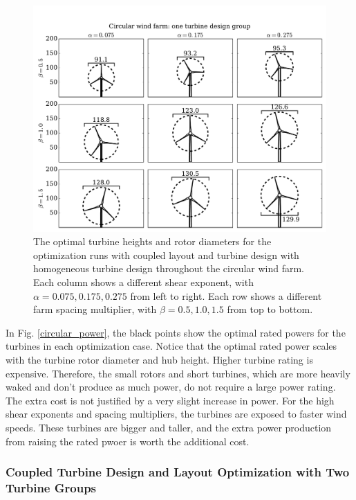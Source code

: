 \begin{figure}[htbp]
  \centering
  \includegraphics[trim={0.5cm 0.3cm 0.3cm 1.75cm},clip,width=\textwidth]{Figures/turbineSizesCircular_1.pdf}
  \caption{\label{circular_turbines_1} The optimal turbine heights and rotor diameters for the optimization runs with coupled layout and turbine design with homogeneous turbine design throughout the circular wind farm. Each column shows a different shear exponent, with $\alpha=0.075,0.175,0.275$ from left to right. Each row shows a different farm spacing multiplier, with $\beta=0.5,1.0,1.5$ from top to bottom.}
\end{figure}

In Fig. \ref{circular_power}, the black points show the optimal rated powers for the turbines in each optimization case. Notice that the optimal rated power scales with the turbine rotor diameter and hub height. Higher turbine rating is expensive. Therefore, the small rotors and short turbines, which are more heavily waked and don't produce as much power, do not require a large power rating. The extra cost is not justified by a very slight increase in power. For the high shear exponents and spacing multipliers, the turbines are exposed to faster wind speeds. These turbines are bigger and taller, and the extra power production from raising the rated pwoer is worth the additional cost.



\subsubsection{Coupled Turbine Design and Layout Optimization with Two Turbine Groups}

